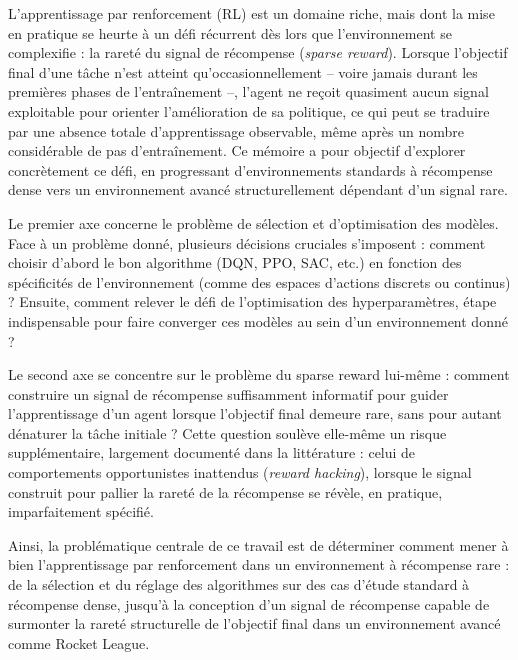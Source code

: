 L'apprentissage par renforcement (RL) est un domaine riche, mais dont la mise en pratique se heurte à un défi récurrent dès lors que l'environnement se complexifie : la rareté du signal de récompense (\textit{sparse reward}). Lorsque l'objectif final d'une tâche n'est atteint qu'occasionnellement -- voire jamais durant les premières phases de l'entraînement --, l'agent ne reçoit quasiment aucun signal exploitable pour orienter l'amélioration de sa politique, ce qui peut se traduire par une absence totale d'apprentissage observable, même après un nombre considérable de pas d'entraînement. Ce mémoire a pour objectif d'explorer concrètement ce défi, en progressant d'environnements standards à récompense dense vers un environnement avancé structurellement dépendant d'un signal rare.

Le premier axe concerne le problème de sélection et d'optimisation des modèles. Face à un problème donné, plusieurs décisions cruciales s'imposent : comment choisir d'abord le bon algorithme (DQN, PPO, SAC, etc.) en fonction des spécificités de l'environnement (comme des espaces d'actions discrets ou continus) ? Ensuite, comment relever le défi de l'optimisation des hyperparamètres, étape indispensable pour faire converger ces modèles au sein d'un environnement donné ?

Le second axe se concentre sur le problème du sparse reward lui-même : comment construire un signal de récompense suffisamment informatif pour guider l'apprentissage d'un agent lorsque l'objectif final demeure rare, sans pour autant dénaturer la tâche initiale ? Cette question soulève elle-même un risque supplémentaire, largement documenté dans la littérature : celui de comportements opportunistes inattendus (\textit{reward hacking}), lorsque le signal construit pour pallier la rareté de la récompense se révèle, en pratique, imparfaitement spécifié.

Ainsi, la problématique centrale de ce travail est de déterminer comment mener à bien l'apprentissage par renforcement dans un environnement à récompense rare : de la sélection et du réglage des algorithmes sur des cas d'étude standard à récompense dense, jusqu'à la conception d'un signal de récompense capable de surmonter la rareté structurelle de l'objectif final dans un environnement avancé comme Rocket League.
